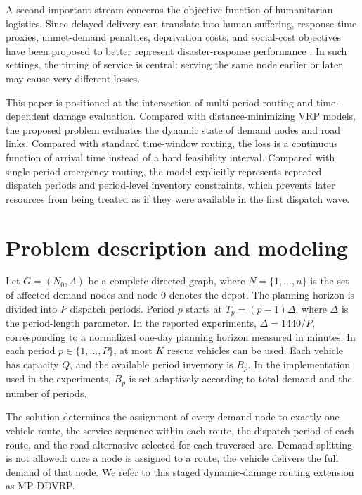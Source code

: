 ﻿\documentclass[preprint,12pt,authoryear]{elsarticle}
\begin{document}
A second important stream concerns the objective function of humanitarian logistics. Since delayed delivery can translate into human suffering, response-time proxies, unmet-demand penalties, deprivation costs, and social-cost objectives have been proposed to better represent disaster-response performance \citep{holguinveras2013objective}. In such settings, the timing of service is central: serving the same node earlier or later may cause very different losses.

This paper is positioned at the intersection of multi-period routing and time-dependent damage evaluation. Compared with distance-minimizing VRP models, the proposed problem evaluates the dynamic state of demand nodes and road links. Compared with standard time-window routing, the loss is a continuous function of arrival time instead of a hard feasibility interval. Compared with single-period emergency routing, the model explicitly represents repeated dispatch periods and period-level inventory constraints, which prevents later resources from being treated as if they were available in the first dispatch wave.

\section{Problem description and modeling}
\label{sec:model}

Let $G=(N_0,A)$ be a complete directed graph, where $N=\{1,\ldots,n\}$ is the set of affected demand nodes and node $0$ denotes the depot. The planning horizon is divided into $P$ dispatch periods. Period $p$ starts at $T_p=(p-1)\Delta$, where $\Delta$ is the period-length parameter. In the reported experiments, $\Delta=1440/P$, corresponding to a normalized one-day planning horizon measured in minutes. In each period $p\in\{1,\ldots,P\}$, at most $K$ rescue vehicles can be used. Each vehicle has capacity $Q$, and the available period inventory is $B_p$. In the implementation used in the experiments, $B_p$ is set adaptively according to total demand and the number of periods.

The solution determines the assignment of every demand node to exactly one vehicle route, the service sequence within each route, the dispatch period of each route, and the road alternative selected for each traversed arc. Demand splitting is not allowed: once a node is assigned to a route, the vehicle delivers the full demand of that node. We refer to this staged dynamic-damage routing extension as MP-DDVRP.
\end{document}

